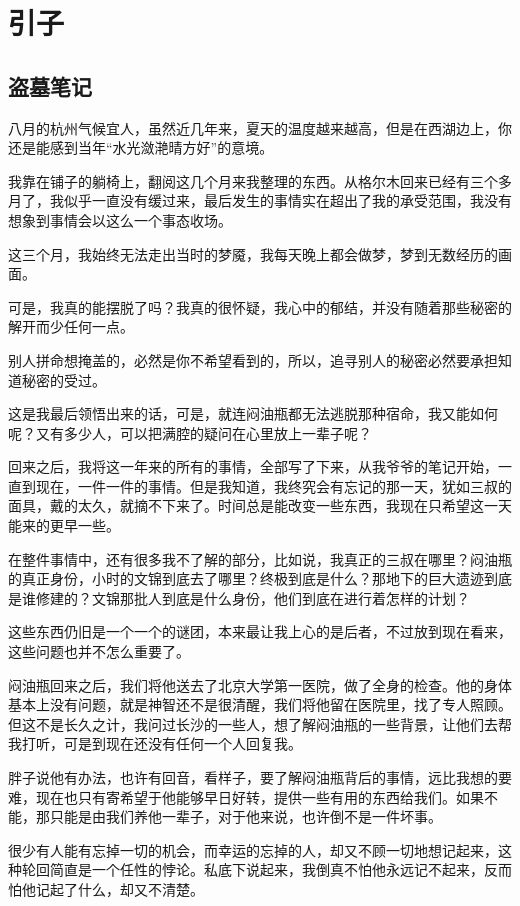 \part{引子}
\chapter{盗墓笔记}

八月的杭州气候宜人，虽然近几年来，夏天的温度越来越高，但是在西湖边上，你还是能感到当年“水光潋滟晴方好”的意境。

我靠在铺子的躺椅上，翻阅这几个月来我整理的东西。从格尔木回来已经有三个多月了，我似乎一直没有缓过来，最后发生的事情实在超出了我的承受范围，我没有想象到事情会以这么一个事态收场。

这三个月，我始终无法走出当时的梦魇，我每天晚上都会做梦，梦到无数经历的画面。

可是，我真的能摆脱了吗？我真的很怀疑，我心中的郁结，并没有随着那些秘密的解开而少任何一点。

别人拼命想掩盖的，必然是你不希望看到的，所以，追寻别人的秘密必然要承担知道秘密的受过。

这是我最后领悟出来的话，可是，就连闷油瓶都无法逃脱那种宿命，我又能如何呢？又有多少人，可以把满腔的疑问在心里放上一辈子呢？

回来之后，我将这一年来的所有的事情，全部写了下来，从我爷爷的笔记开始，一直到现在，一件一件的事情。但是我知道，我终究会有忘记的那一天，犹如三叔的面具，戴的太久，就摘不下来了。时间总是能改变一些东西，我现在只希望这一天能来的更早一些。

在整件事情中，还有很多我不了解的部分，比如说，我真正的三叔在哪里？闷油瓶的真正身份，小时的文锦到底去了哪里？终极到底是什么？那地下的巨大遗迹到底是谁修建的？文锦那批人到底是什么身份，他们到底在进行着怎样的计划？

这些东西仍旧是一个一个的谜团，本来最让我上心的是后者，不过放到现在看来，这些问题也并不怎么重要了。

闷油瓶回来之后，我们将他送去了北京大学第一医院，做了全身的检查。他的身体基本上没有问题，就是神智还不是很清醒，我们将他留在医院里，找了专人照顾。但这不是长久之计，我问过长沙的一些人，想了解闷油瓶的一些背景，让他们去帮我打听，可是到现在还没有任何一个人回复我。

胖子说他有办法，也许有回音，看样子，要了解闷油瓶背后的事情，远比我想的要难，现在也只有寄希望于他能够早日好转，提供一些有用的东西给我们。如果不能，那只能是由我们养他一辈子，对于他来说，也许倒不是一件坏事。

很少有人能有忘掉一切的机会，而幸运的忘掉的人，却又不顾一切地想记起来，这种轮回简直是一个任性的悖论。私底下说起来，我倒真不怕他永远记不起来，反而怕他记起了什么，却又不清楚。

